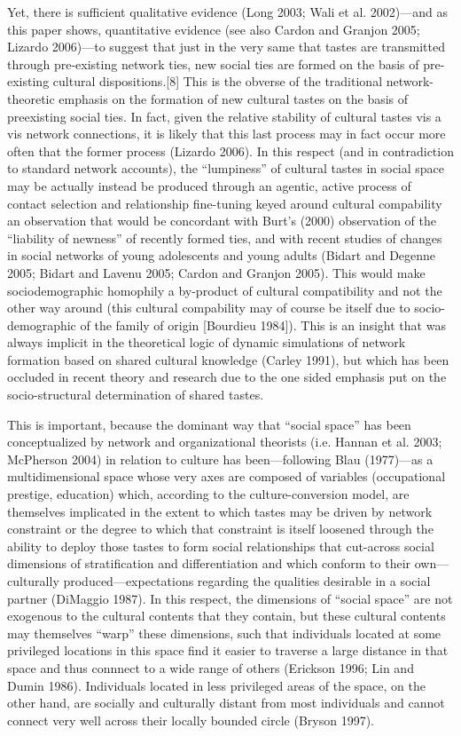 Yet, there is sufficient qualitative evidence (Long 2003; Wali et al. 2002)—and as this paper shows, quantitative evidence (see also Cardon and Granjon 2005; Lizardo 2006)—to suggest that just in the very same that tastes are transmitted through pre-existing network ties, new social ties are formed on the basis of pre-existing cultural dispositions.[8] This is the obverse of the traditional network-theoretic emphasis on the formation of new cultural tastes on the basis of preexisting social ties. In fact, given the relative stability of cultural tastes vis a vis network connections, it is likely that this last process may in fact occur more often that the former process (Lizardo 2006). In this respect (and in contradiction to standard network accounts), the “lumpiness” of cultural tastes in social space may be actually instead be produced through an agentic, active process of contact selection and relationship fine-tuning keyed around cultural compability an observation that would be concordant with Burt’s (2000) observation of the “liability of newness” of recently formed ties, and with recent studies of changes in social networks of young adolescents and young adults (Bidart and Degenne 2005; Bidart and Lavenu 2005; Cardon and Granjon 2005). This would make sociodemographic homophily a by-product of cultural compatibility and not the other way around (this cultural compability may of course be itself due to socio-demographic of the family of origin [Bourdieu 1984]). This is an insight that was always implicit in the theoretical logic of dynamic simulations of network formation based on shared cultural knowledge (Carley 1991), but which has been occluded in recent theory and research due to the one sided emphasis put on the socio-structural determination of shared tastes.

This is important, because the dominant way that “social space” has been conceptualized by network and organizational theorists (i.e. Hannan et al. 2003; McPherson 2004) in relation to culture has been—following Blau (1977)—as a multidimensional space whose very axes are composed of variables (occupational prestige, education) which, according to the culture-conversion model, are themselves implicated in the extent to which tastes may be driven by network constraint or the degree to which that constraint is itself loosened through the ability to deploy those tastes to form social relationships that cut-across social dimensions of stratification and differentiation and which conform to their own—culturally produced—expectations regarding the qualities desirable in a social partner (DiMaggio 1987). In this respect, the dimensions of “social space” are not exogenous to the cultural contents that they contain, but these cultural contents may themselves “warp” these dimensions, such that individuals located at some privileged locations in this space find it easier to traverse a large distance in that space and thus connnect to a wide range of others (Erickson 1996; Lin and Dumin 1986). Individuals located in less privileged areas of the space, on the other hand, are socially and culturally distant from most individuals and cannot connect very well across their locally bounded circle (Bryson 1997).


